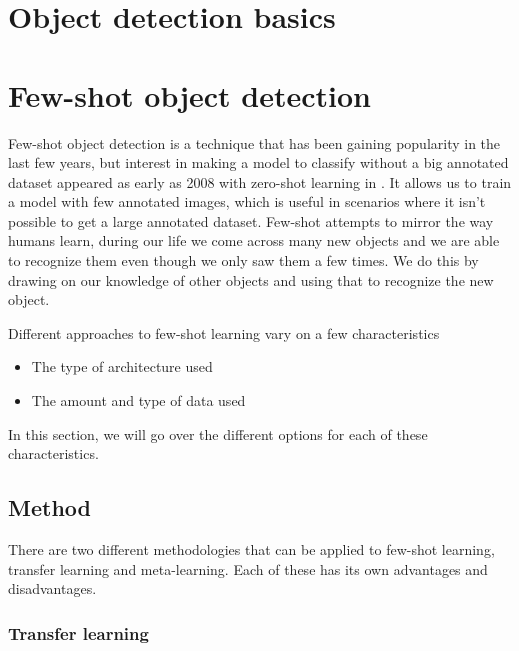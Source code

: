 

\section{Object detection basics}

\section{Few-shot object detection}
Few-shot object detection is a technique that has been gaining popularity in the last few years, but interest in making a model to classify without a big annotated dataset appeared as early as 2008 with zero-shot learning in \citet{aaai08-132}. It allows us to train a model with few annotated images, which is useful in scenarios where it isn't possible to get a large annotated dataset. Few-shot attempts to mirror the way humans learn, during our life we come across many new objects and we are able to recognize them even though we only saw them a few times. We do this by drawing on our knowledge of other objects and using that to recognize the new object\cite{biederman1987recognition}. 

Different approaches to few-shot learning vary on a few characteristics
\begin{itemize}
	\item The type of architecture used
	\item The amount and type of data used
\end{itemize}

In this section, we will go over the different options for each of these characteristics.

\subsection{Method}

There are two different methodologies that can be applied to few-shot learning, transfer learning and meta-learning. Each of these has its own advantages and disadvantages. %

\subsubsection*{Transfer learning}

